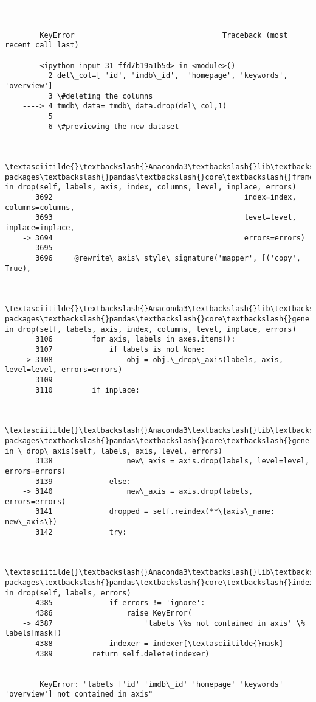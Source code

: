 \documentclass[11pt]{article}
\begin{document}
    \begin{Verbatim}[commandchars=\\\{\}]

        ---------------------------------------------------------------------------

        KeyError                                  Traceback (most recent call last)

        <ipython-input-31-ffd7b19a1b5d> in <module>()
          2 del\_col=[ 'id', 'imdb\_id',  'homepage', 'keywords', 'overview']
          3 \#deleting the columns
    ----> 4 tmdb\_data= tmdb\_data.drop(del\_col,1)
          5 
          6 \#previewing the new dataset
    

        \textasciitilde{}\textbackslash{}Anaconda3\textbackslash{}lib\textbackslash{}site-packages\textbackslash{}pandas\textbackslash{}core\textbackslash{}frame.py in drop(self, labels, axis, index, columns, level, inplace, errors)
       3692                                            index=index, columns=columns,
       3693                                            level=level, inplace=inplace,
    -> 3694                                            errors=errors)
       3695 
       3696     @rewrite\_axis\_style\_signature('mapper', [('copy', True),
    

        \textasciitilde{}\textbackslash{}Anaconda3\textbackslash{}lib\textbackslash{}site-packages\textbackslash{}pandas\textbackslash{}core\textbackslash{}generic.py in drop(self, labels, axis, index, columns, level, inplace, errors)
       3106         for axis, labels in axes.items():
       3107             if labels is not None:
    -> 3108                 obj = obj.\_drop\_axis(labels, axis, level=level, errors=errors)
       3109 
       3110         if inplace:
    

        \textasciitilde{}\textbackslash{}Anaconda3\textbackslash{}lib\textbackslash{}site-packages\textbackslash{}pandas\textbackslash{}core\textbackslash{}generic.py in \_drop\_axis(self, labels, axis, level, errors)
       3138                 new\_axis = axis.drop(labels, level=level, errors=errors)
       3139             else:
    -> 3140                 new\_axis = axis.drop(labels, errors=errors)
       3141             dropped = self.reindex(**\{axis\_name: new\_axis\})
       3142             try:
    

        \textasciitilde{}\textbackslash{}Anaconda3\textbackslash{}lib\textbackslash{}site-packages\textbackslash{}pandas\textbackslash{}core\textbackslash{}indexes\textbackslash{}base.py in drop(self, labels, errors)
       4385             if errors != 'ignore':
       4386                 raise KeyError(
    -> 4387                     'labels \%s not contained in axis' \% labels[mask])
       4388             indexer = indexer[\textasciitilde{}mask]
       4389         return self.delete(indexer)
    

        KeyError: "labels ['id' 'imdb\_id' 'homepage' 'keywords' 'overview'] not contained in axis"

    \end{Verbatim}
\end{document}
